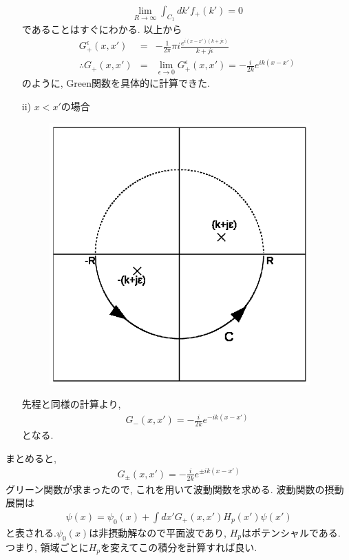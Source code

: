 \documentclass[10.5pt,a4paper]{jreport}
\begin{document}
\begin{itemize}
\begin{eqnarray}
    \lim_{R\rightarrow\infty}\int_{C_1}dk'f_+(k') =0
  \end{eqnarray}
  であることはすぐにわかる. 以上から
  \begin{eqnarray}
    G^\epsilon_+(x, x') &=& -\frac{1}{2\pi}\pi i\frac{e^{i(x-x')(k+j\epsilon)}}{k+j\epsilon}\\
    \therefore G_+(x, x') &=& \lim_{\epsilon\rightarrow 0}G_+^\epsilon(x, x') = -\frac{i}{2k}e^{ik(x-x')}
  \end{eqnarray}
  のように, Green関数を具体的に計算できた.\\
\item[ii)] $x<x'$の場合    
  \begin{figure}[htbp]
    \centering
    \includegraphics[width = 10cm]{./figure2new.eps}
    \label{fig2}
  \end{figure}
  先程と同様の計算より,
  \begin{eqnarray}
    G_-(x, x') = -\frac{i}{2k}e^{-ik(x-x')}
  \end{eqnarray}
  となる. 
\end{itemize}
まとめると,
\begin{eqnarray}
  G_\pm(x, x') = -\frac{i}{2k}e^{\pm ik(x-x')}
\end{eqnarray}
グリーン関数が求まったので, これを用いて波動関数を求める. 波動関数の摂動展開は
\begin{eqnarray}
  \psi(x) = \psi_0(x) + \int dx'G_+(x, x')H_p(x')\psi(x')
\end{eqnarray}
と表される.$\psi_0(x)$は非摂動解なので平面波であり, $H_p$はポテンシャルである. つまり, 領域ごとに$H_p$を変えてこの積分を計算すれば良い.
\end{document}
